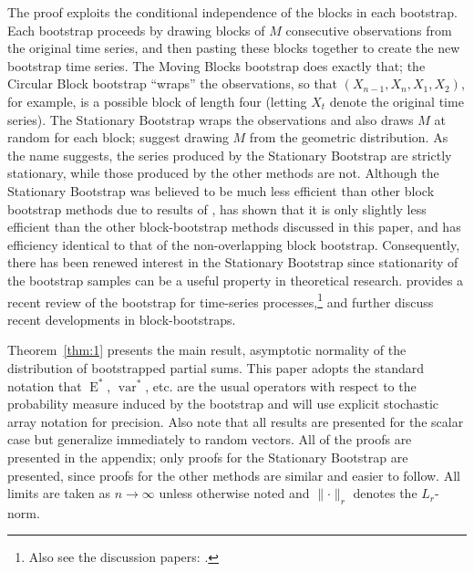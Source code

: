 \documentclass[11pt]{article}
\theoremstyle{definition}
\DeclareMathOperator{\E}{E}
\DeclareMathOperator{\var}{var}
\begin{document}
The proof exploits the conditional independence of the blocks in each
bootstrap.  Each bootstrap proceeds by drawing blocks of $M$
consecutive observations from the original time series, and then
pasting these blocks together to create the new bootstrap time series.
The Moving Blocks bootstrap does exactly that; the Circular Block
bootstrap ``wraps'' the observations, so that $(X_{n-1}, X_n, X_1,
X_2)$, for example, is a possible block of length four (letting $X_t$
denote the original time series).  The Stationary Bootstrap wraps the
observations and also draws $M$ at random for each block;
\citet{PoR:94} suggest drawing $M$ from the geometric distribution.
As the name suggests, the series produced by the Stationary Bootstrap
are strictly stationary, while those produced by the other methods are
not.  Although the Stationary Bootstrap was believed to be much less
efficient than other block bootstrap methods due to results of
\citet{Lah:99}, \citet{Nor:09} has shown that it is only slightly less
efficient than the other block-bootstrap methods discussed in this
paper, and has efficiency identical to that of the non-overlapping
block bootstrap.  Consequently, there has been renewed interest in the
Stationary Bootstrap since stationarity of the bootstrap samples can
be a useful property in theoretical research.  \cite{KrP:11} provides
a recent review of the bootstrap for time-series
processes,\footnote{Also see the discussion papers:
  \citet{Dah:11,GoP:11,Hor:11,JeM:11,KrP:11b}.} and \citet{GoP:11}
further discuss recent developments in block-bootstraps.

Theorem~\ref{thm:1} presents the main result, asymptotic normality of
the distribution of bootstrapped partial sums.  This paper adopts the
standard notation that $\E^{*}$, $\var^{*}$, etc. are the usual
operators with respect to the probability measure induced by the
bootstrap and will use explicit stochastic array notation 
for precision.  Also note that all results are presented for the
scalar case but generalize immediately to random vectors.  All of the
proofs are presented in the appendix; only proofs for the Stationary
Bootstrap are presented, since proofs for the other methods are
similar and easier to follow.  All limits are taken as $n \to \infty$
unless otherwise noted and $\lVert \cdot \rVert_r$ denotes the
$L_r$-norm.
\end{document}
